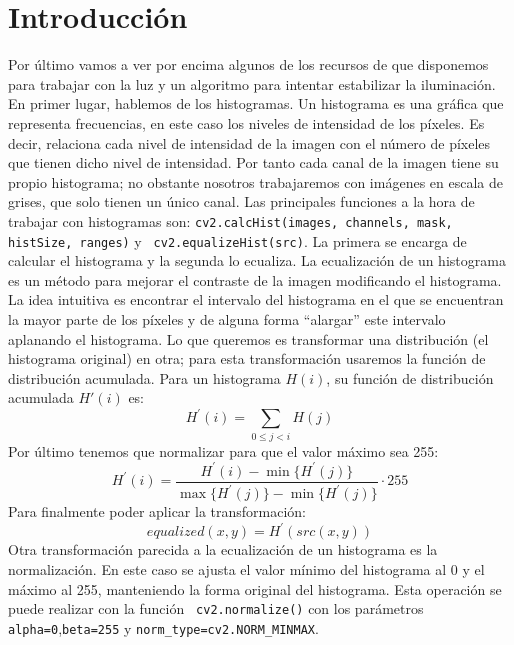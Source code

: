 \documentclass[a4paper,openright, 12pt]{book}
\begin{document}
\section{Introducción}
Por último vamos a ver por encima algunos de los recursos de que disponemos para trabajar con la luz y un algoritmo para intentar estabilizar la iluminación.
\newline
En primer lugar, hablemos de los histogramas. Un histograma es una gráfica que representa frecuencias, en este caso los niveles de intensidad de los píxeles. Es decir, relaciona cada nivel de intensidad de la imagen con el número de píxeles que tienen dicho nivel de intensidad. Por tanto cada canal de la imagen tiene su propio histograma; no obstante nosotros trabajaremos con imágenes en escala de grises, que solo  tienen un único canal.
\newline
Las principales funciones a la hora de trabajar con histogramas son:
\newline
\lstinline|cv2.calcHist(images, channels, mask, histSize, ranges)| y
\newline \lstinline| cv2.equalizeHist(src)|.
La primera se encarga de calcular el histograma y la segunda lo ecualiza.
\newline 
La ecualización de un histograma es un método para mejorar el contraste de la imagen modificando el histograma. La idea intuitiva es encontrar el intervalo del histograma en el que se encuentran la mayor parte de los píxeles y de alguna forma ``alargar'' este intervalo aplanando el histograma. Lo que queremos es transformar una distribución (el histograma original) en otra; para esta transformación usaremos la función de distribución acumulada. Para un histograma $H(i)$, su función de distribución acumulada $H'(i)$ es:
\begin{equation*}
H^{'}(i) = \sum_{0 \le j < i} H(j)
\end{equation*}
Por último tenemos que normalizar para que el valor máximo sea 255:
\begin{equation*}
H^{'}(i) =\frac{H^{'}(i) - \min\{H^{'}(j)\}} {\max\{H^{'}(j)\}-\min\{H^{'}(j)\}} \cdot255
\end{equation*}
Para finalmente poder aplicar la transformación:
\begin{equation*}
equalized( x, y ) = H^{'}( src(x,y) )
\end{equation*}
Otra transformación parecida a la ecualización de un histograma es la normalización. En este caso se ajusta el valor mínimo del histograma al 0 y el máximo al 255, manteniendo la forma original del histograma. Esta operación se puede realizar con la función \lstinline| cv2.normalize()| con los parámetros \lstinline|alpha=0|,\lstinline|beta=255| y \lstinline|norm_type=cv2.NORM_MINMAX|.
\end{document}
